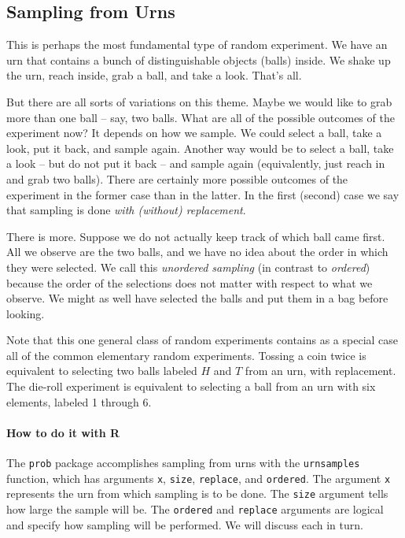 \documentclass[captions=tableheading]{scrbook}
\begin{document}
\subsection{Sampling from Urns}
\label{sec-4-1-1}

\label{sub:sampling-from-urns}

This is perhaps the most fundamental type of random experiment. We have an urn that contains a bunch of distinguishable objects (balls) inside. We shake up the urn, reach inside, grab a ball, and take a look. That's all.

But there are all sorts of variations on this theme. Maybe we would like to grab more than one ball -- say, two balls. What are all of the possible outcomes of the experiment now? It depends on how we sample. We could select a ball, take a look, put it back, and sample again. Another way would be to select a ball, take a look -- but do not put it back -- and sample again (equivalently, just reach in and grab two balls). There are certainly more possible outcomes of the experiment in the former case than in the latter. In the first (second) case we say that sampling is done \emph{with (without) replacement}.

There is more. Suppose we do not actually keep track of which ball came first. All we observe are the two balls, and we have no idea about the order in which they were selected. We call this \emph{unordered sampling} (in contrast to \emph{ordered}) because the order of the selections does not matter with respect to what we observe. We might as well have selected the balls and put them in a bag before looking.

Note that this one general class of random experiments contains as a special case all of the common elementary random experiments. Tossing a coin twice is equivalent to selecting two balls labeled \(H\) and \(T\) from an urn, with replacement. The die-roll experiment is equivalent to selecting a ball from an urn with six elements, labeled 1 through 6.

\paragraph*{How to do it with \textsf{R}} 

The \texttt{prob} package accomplishes sampling from urns with the \texttt{urnsamples} function, which has arguments \texttt{x}, \texttt{size}, \texttt{replace}, and \texttt{ordered}. The argument \texttt{x} represents the urn from which sampling is to be done. The \texttt{size} argument tells how large the sample will be. The \texttt{ordered} and \texttt{replace} arguments are logical and specify how sampling will be performed. We will discuss each in turn.
\end{document}
